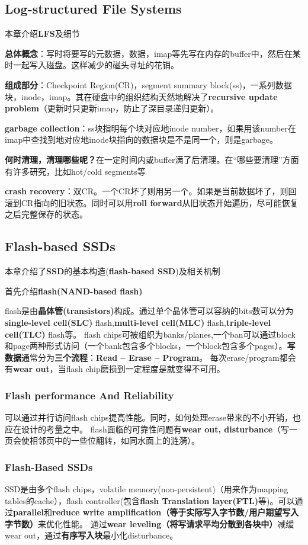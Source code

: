 \documentclass{article}
\begin{document}
\subsection{Log-structured File Systems}
本章介绍\textbf{LFS}及细节

\textbf{总体概念}：写时将要写的元数据，数据，imap等先写在内存的buffer中，然后在某时一起写入磁盘。这样减少的磁头寻址的花销。 

\textbf{组成部分}：Checkpoint Region(CR)，segment summary block(ss)，一系列数据块，inode，imap。其在硬盘中的组织结构天然地解决了\textbf{recursive update problem}（更新时只更新imap，防止了深目录递归更新）。 

\textbf{garbage collection}：ss块指明每个块对应地inode number，如果用该number在imap中查找到地对应地inode块指向的数据块是不是同一个，则是garbage。

\textbf{何时清理，清理哪些呢？}在一定时间内或buffer满了后清理。在“哪些要清理”方面有许多研究，比如hot/cold segments等

\textbf{crash recovery}：双CR。一个CR坏了则用另一个。如果是当前数据坏了，则回滚到CR指向的旧状态。同时可以用\textbf{roll forward}从旧状态开始遍历，尽可能恢复之后完整保存的状态。
\subsection{Flash-based SSDs}
本章介绍了\textbf{SSD}的基本构造(\textbf{flash-based SSD})及相关机制

首先介绍\textbf{flash(NAND-based flash)}

flash是由\textbf{晶体管(transistors)}构成。通过单个晶体管可以容纳的bits数可以分为\textbf{single-level cell(SLC)} flash,\textbf{multi-level cell(MLC)} flash,\textbf{triple-level cell(TLC)} flash等。
flash chips可被组织为banks/planes,一个ban可以通过block和page两种形式访问（一个bank包含多个blocks，一个block包含多个pages）。\textbf{写数据}通常分为\textbf{三个流程}：\textbf{Read -- Erase -- Program}。
每次erase/program都会有\textbf{wear out}，当flash chip磨损到一定程度是就变得不可用。
\subsubsection{Flash performance And Reliability}
可以通过并行访问flash chips提高性能。同时，如何处理erase带来的不小开销，也应在设计的考量之中。
flash面临的可靠性问题有\textbf{wear out, disturbance}（写一页会使相邻页中的一些位翻转，如同水面上的涟漪）。
\subsubsection{Flash-Based SSDs}
SSD是由多个flash chips，volatile memory(non-persistent)（用来作为mapping tables的cache），flash controller(包含\textbf{flash Translation layer(FTL)}等)。可以通过\textbf{parallel}和\textbf{reduce write amplification（等于实际写入字节数/用户期望写入字节数）}来优化性能。
通过\textbf{wear leveling（将写请求平均分散到各块中）}减缓wear out，通过\textbf{有序写入块}最小化disturbance。
\end{document}

